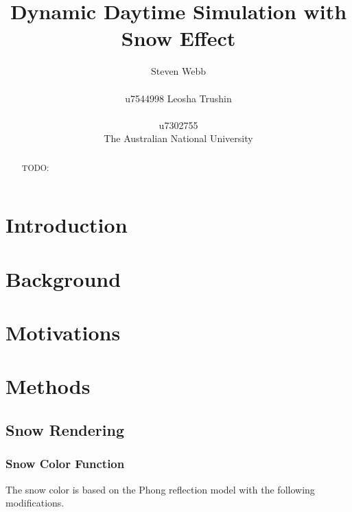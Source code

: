 \documentclass{article}
\title{Dynamic Daytime Simulation with Snow Effect}
\author{%
  Steven Webb\\\\
  u7544998 
   \And
  Leosha Trushin\\\\
  u7302755\\
  \AND  The Australian National University 
}
\begin{document}
\maketitle

\begin{abstract}
TODO:
\end{abstract}

\section{Introduction}

\section{Background}

\section{Motivations}

\section {Methods}

\subsection {Snow Rendering}

\subsubsection {Snow Color Function}
The snow color is based on the Phong reflection model with the following modifications.
\end{document}
